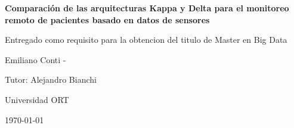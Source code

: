 \begin{titlepage}
    \centering
    {\huge\bfseries Comparación de las arquitecturas Kappa y Delta para el monitoreo remoto de pacientes basado en datos de sensores \par}
    \vspace{2cm}
    {\Large Entregado como requisito para la obtencion del
titulo de Master en Big Data\par}
    \vspace{1cm}
    {\large Emiliano Conti - \par}
    \vspace{1cm}
    {\large Tutor: Alejandro Bianchi \par}
    \vspace{1cm}
    {\small Universidad ORT\par}
    \vspace{1cm}
    {\large \today\par}
\end{titlepage}